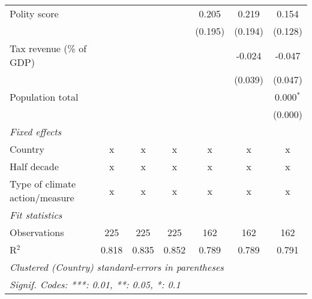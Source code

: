 \begin{tabular}{lcccccc}
   Polity score                                                 &               &                &                & 0.205          & 0.219          & 0.154\\   
                                                                &               &                &                & (0.195)        & (0.194)        & (0.128)\\   
   Tax revenue (\% of GDP)                                      &               &                &                &                & -0.024         & -0.047\\   
                                                                &               &                &                &                & (0.039)        & (0.047)\\   
   Population total                                             &               &                &                &                &                & 0.000$^{*}$\\   
                                                                &               &                &                &                &                & (0.000)\\   
   \emph{Fixed effects}\\
   Country                                                      & x             & x              & x              & x              & x              & x\\  
   Half decade                                                  & x             & x              & x              & x              & x              & x\\  
   Type of climate action/measure                               & x             & x              & x              & x              & x              & x\\  
   \midrule \emph{Fit statistics}\\
   Observations                                                 & 225           & 225            & 225            & 162            & 162            & 162\\  
   R$^2$                                                        & 0.818         & 0.835          & 0.852          & 0.789          & 0.789          & 0.791\\  
   \midrule
   \multicolumn{7}{l}{\emph{Clustered (Country) standard-errors in parentheses}}\\
   \multicolumn{7}{l}{\emph{Signif. Codes: ***: 0.01, **: 0.05, *: 0.1}}\\
\end{tabular}
\par\endgroup


